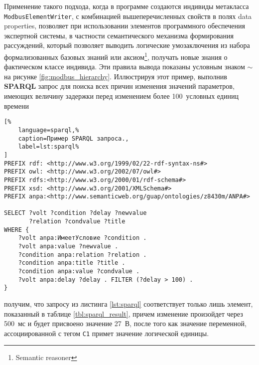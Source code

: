 Применение такого подхода, когда в программе \protege создаются индивиды метакласса \texttt{ModbusElementWriter},
с комбинацией вышеперечисленных свойств в полях data properties, позволяет при использовании элементов программного обеспечения экспертной системы,
в частности семантического механизма формирования рассуждений, который позволяет выводить логические умозаключения из набора формализованных базовых
знаний или аксиом\footnote{Semantic reasoner}, получать новые знания о фактическом классе индивида.
Эти правила вывода показаны условным знаком $\sim$ на рисунке \ref{fig:modbus_hierarchy}.
Иллюстрируя этот пример, выполнив \textbf{SPARQL} запрос для поиска всех причин изменения значений параметров,
имеющих величину задержки перед изменением более 100~условных единиц времени
\begin{lstlisting}[%
    language=sparql,%
    caption=Пример SPARQL запроса.,
    label=lst:sparql%
]
PREFIX rdf: <http://www.w3.org/1999/02/22-rdf-syntax-ns#>
PREFIX owl: <http://www.w3.org/2002/07/owl#>
PREFIX rdfs:<http://www.w3.org/2000/01/rdf-schema#>
PREFIX xsd: <http://www.w3.org/2001/XMLSchema#>
PREFIX anpa:<http://www.semanticweb.org/guap/ontologies/z8430m/ANPA#>

SELECT ?volt ?condition ?delay ?newvalue 
       ?relation ?condvalue ?title
WHERE {
    ?volt anpa:ИмеетУсловие ?condition .
    ?volt anpa:value ?newvalue .
    ?condition anpa:relation ?relation .
    ?condition anpa:title ?title .
    ?condition anpa:value ?condvalue .
    ?volt anpa:delay ?delay . FILTER (?delay > 100) .
}
\end{lstlisting}
получим, что запросу из листинга \ref{lst:sparql} соответствует только лишь элемент, показанный в таблице \ref{tbl:sparql_result},
причем изменение произойдет через 500~мс и будет присвоено значение 27~В, после того как значение переменной,
ассоциированной с тегом \texttt{C1} примет значение логической единицы.

